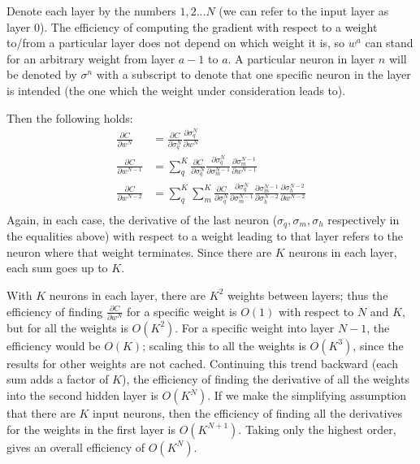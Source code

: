 \documentclass{article}
\begin{document}
   Denote each layer by the numbers $1,2... N$ (we can refer to the input layer as layer $0$).
   The efficiency of computing the gradient with respect to a weight to/from a particular layer
   does not depend on which weight it is, so $w^{a}$ can stand for an arbitrary weight from
   layer $a-1$ to $a$. A particular neuron in layer $n$ will be denoted by $\sigma^n$ with a
   subscript to denote that one specific neuron in the layer is intended (the one which the
   weight under consideration leads to).

   Then the following holds: %
      \begin{equation*} \begin{split}
        \frac{ \partial C}{ \partial w^{N} }
           &= \frac{ \partial C}{ \partial \sigma^N_q }  \frac{ \partial \sigma^N_q}{ \partial w^{N} } \\
        \frac{ \partial C}{ \partial w^{N-1} }
           &= \sum_q^K \frac{ \partial C}{ \partial \sigma^{N}_q }  \frac{ \partial \sigma^{N}_q }{\partial \sigma^{N-1}_m}  \frac{ \partial \sigma^{N-1}_m }{ \partial w^{N-1} } \\
        \frac{ \partial C}{ \partial w^{N-2} }
           &= \sum_q^K \sum_m^K \frac{ \partial C}{ \partial \sigma^{N}_q }  \frac{ \partial \sigma^{N}_q }{\partial \sigma^{N-1}_m}   \frac{ \partial \sigma^{N-1}_m }{\partial \sigma^{N-2}_h}   \frac{ \partial \sigma^{N-2}_h }{ \partial w^{N-2} } \\
      \end{split} \end{equation*}
   Again, in each case, the derivative of the last neuron ($\sigma_q, \sigma_m, \sigma_h$ respectively in the
   equalities above) with respect to a weight leading to that layer refers to the neuron where
   that weight terminates.
   Since there are $K$ neurons in each layer, each sum goes up to $K$.

   With $K$ neurons in each layer, there are $K^2$ weights between layers; thus the efficiency of
   finding $ \frac{ \partial C}{ \partial w^{N} } $ for a specific weight is $O(1)$ with respect
   to $N$ and $K$, but for all the weights is $O(K^2)$.
   For a specific weight into layer $N-1$, the efficiency would be $O(K)$; scaling this to
   all the weights is $O(K^3)$, since the results for other weights are not cached.
   Continuing this trend backward (each sum adds a factor of $K$), the efficiency of finding the derivative of all the weights
   into the second hidden layer is $O(K^{N})$.
   If we make the simplifying assumption that there are $K$ input neurons, then the efficiency
   of finding all the derivatives for the weights in the first layer is $O(K^{N+1})$.
   Taking only the highest order, gives an overall efficiency of $O(K^{N})$.
\end{document}
